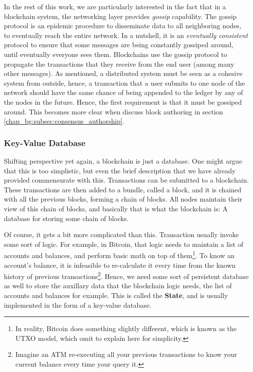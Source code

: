 In the rest of this work, we are particularly interested in the fact that in a blockchain system,
the networking layer provides \textit{gossip} capability. The gossip protocol is an epidemic
procedure to disseminate data to all neighboring nodes, to eventually reach the entire network. In a
nutshell, it is an \textit{eventually consistent} protocol to ensure that some messages are being
constantly gossiped around, until eventually everyone sees them. Blockchains use the gossip protocol
to propagate the transactions that they receive from the end user (among many other messages). As
mentioned, a distributed system must be seen as a cohesive system from outside, hence, a transaction
that a user submits to one node of the network should have the same chance of being appended to the
ledger by any of the nodes in the future. Hence, the first requirement is that it must be gossiped
around. This becomes more clear when discuss block authoring in section
\ref{chap_bg:subsec:consensus_authorship}.

\subsubsection{Key-Value Database} \label{chap_bg:subsec:kvdb}

Shifting perspective yet again, a blockchain is just a database. One might argue that this is too
simplistic, but even the brief description that we have already provided commensurate with this.
Transactions can be submitted to a blockchain. These transactions are then added to a bundle, called
a block, and it is chained with all the previous blocks, forming a chain of blocks. All nodes
maintain their view of this chain of blocks, and basically that is what the blockchain is: A
database for storing some chain of blocks.

Of course, it gets a bit more complicated than this. Transaction usually invoke some sort of logic.
For example, in Bitcoin, that logic needs to maintain a list of accounts and balances, and perform
basic math on top of them\footnote{In reality, Bitcoin does something slightly different, which is
known as the UTXO model, which omit to explain here for simplicity.}. To know an account's balance,
it is infeasible to re-calculate it every time from the known history of previous
transactions\footnote{Imagine an ATM re-executing all your previous transactions to know your
current balance every time your query it.}. Hence, we need some sort of persistent database as well
to store the auxillary data that the blockchain logic needs, the list of accounts and balances for
example. This is called the \textbf{State}, and is usually implemented in the form of a key-value
database.

